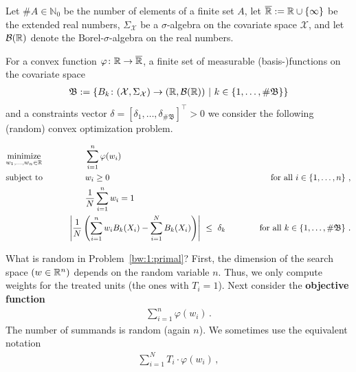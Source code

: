 Let
$\# A\in\mathbb{N}_0$ be the number of elements of a finite set $A$, let
$\overline{\mathbb{R}}:=\mathbb{R}\cup \left\{ \infty \right\}$ 
be the extended real numbers, 
$\Sigma_\mathcal{X}$ be a $\sigma$-algebra on the covariate space $\mathcal{X}$,
and let $\mathcal{B}(\mathbb{R})$ denote the Borel-$\sigma$-algebra on the real numbers.

For a convex function $\varphi\colon \mathbb{R}\to\overline{\mathbb{R}}$,
a finite set of measurable (basis-)functions on the covariate space
\begin{gather*}
  \mathfrak{B}
  :
  =
  \left\{ 
B_k\colon (\mathcal{X},\Sigma_\mathcal{X})\to(\R,\mathcal{B}(\R))
\ 
|
\ 
k\in \left\{ 1,\ldots,\# \mathfrak{B} \right\}
  \right\}
\end{gather*}
and a constraints vector $\delta=[\delta_1,\ldots,\delta_{\# \mathfrak{B}}]^\top>0$
we consider the following (random) convex optimization problem.
\begin{fproblem}
  \label{bw:1:primal}
\begin{align*}
    &\underset{w_1, \ldots, w_n \in \R}
    {\text{minimize}}
    &&\qquad\qquad
    \sum_{i = 1}^{n} 
    \varphi(w_i)
    &&&
    \\
    &\text{subject to}
    &&\qquad\qquad
    w_i 
    \ge
    0
    &&&
    \qquad
    \text{for all}\ 
    i \in \left\{ 1, \ldots, n \right\}
    \,,
    \\
    & 
    &&\qquad\qquad
    \frac{1}{N}
    \sum_{i=1}^{n} 
    w_i
    =1
    \\
    & 
    &&\qquad
    \left| 
      \frac{1}{N} 
      \left( 
      \sum_{i = 1}^{n} 
      w_i
      B_k(X_i)
      -
      \sum_{i=1}^{N} 
      B_k(X_i)
      \right)
    \right|
    \ 
    \le 
    \ 
    \delta_k
    &&&
    \qquad
    \text{for all}\ 
    k \in \left\{ 1, \ldots, \# \mathfrak{B} \right\}
    \,.
\end{align*}
\end{fproblem}
What is random in Problem~\ref{bw:1:primal}?
First, the dimension of the search space $(w\in\mathbb{R}^n)$ depends on the random variable $n$. 
Thus, we only compute weights for the treated units (the ones with $T_i=1$).
Next consider the \textbf{objective function}
\begin{gather*}
    \sum_{i = 1}^{n} 
    \varphi(w_i)
    \,.
\end{gather*}
The number of summands is random (again $n$). We sometimes use the equivalent notation
\begin{gather*}
    \sum_{i = 1}^{N} 
    T_i
    \cdot
    \varphi(w_i)
    \,,
\end{gather*}
